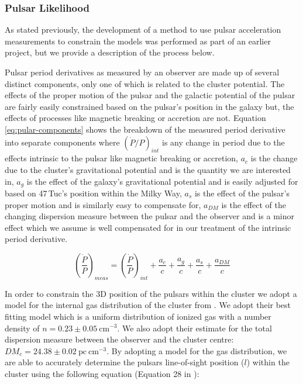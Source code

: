 \subsubsection{Pulsar Likelihood}

As stated previously, the development of a method to use pulsar acceleration measurements to
constrain the models was performed as part of an earlier project, but we provide a description
of the process below.


Pulsar period derivatives as measured by an observer are made up of several distinct components,
only one of which is related to the cluster potential. The effects of the proper motion of the
pulsar and the galactic potential of the pulsar are fairly easily constrained based on the pulsar's
position in the galaxy but, the effects of processes like magnetic breaking or accretion are not.
Equation \ref{eq:pular-components} shows the breakdown of the measured period derivative into
separate components where $(\dot{P}/P)_{int}$ is any change in period due to the effects intrinsic
to the pulsar like magnetic breaking or accretion, $a_c$ is the change due to the cluster's
gravitational potential and is the quantity we are interested in, $a_g$ is the effect of the
galaxy's gravitational potential and is easily adjusted for based on 47\,Tuc's position within the
Milky Way, $a_s$ is the effect of the pulsar's proper motion and is similarly easy to compensate
for, $a_{DM}$ is the effect of the changing dispersion measure between the pulsar and the observer
and is a minor effect which we assume is well compensated for in our treatment of the intrinsic
period derivative.

\begin{equation}
    \left(\frac{\dot{P}}{P}\right)_{meas} = \left(\frac{\dot{P}}{P}\right)_{int} + \frac{a_c}{c} +
    \frac{a_g}{c} + \frac{a_s}{c} + \frac{a_{DM}}{c}
    \label{eq:pular-components}
\end{equation}



In order to constrain the 3D position of the pulsars within the cluster we adopt a model for the
internal gas distribution of the cluster from \citet{Abbate2018}. We adopt their best fitting model
which is a uniform distribution of ionized gas with a number density of $n = 0.23 \pm 0.05 \
    \text{cm}^{-3}$. We also adopt their estimate for the total dispersion measure between the observer
and the cluster centre: $DM_c = 24.38 \pm 0.02 \ \mathrm{pc \ cm}^{-3}$. By adopting a model for the
gas distribution, we are able to accurately determine the pulsars line-of-sight position ($l$)
within the cluster using the following equation (Equation 28 in \citet{Abbate2018}):

